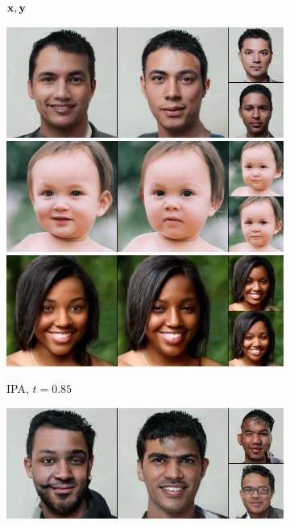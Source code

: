 \begin{figure}[t]
\begin{subfigure}[t]{0.22\textwidth}
      \caption{\scriptsize ${\mathbf{x}}, {\mathbf{y}}$}
    \end{subfigure}
    \begin{subfigure}[t]{0.25\textwidth}
      \centering
      \includegraphics[height=\ffhqimgheight]{figs/cigcvae/image-samples/ffhq256/freeform_aipo_0_t=0.85_samples.jpg}
      \includegraphics[height=\ffhqimgheight]{figs/cigcvae/image-samples/ffhq256/freeform_aipo_13_t=0.85_samples.jpg}
      \includegraphics[height=\ffhqimgheight]{figs/cigcvae/image-samples/ffhq256/freeform_aipo_32_t=0.85_samples.jpg}
      \caption{\scriptsize IPA, $t=0.85$}
    \end{subfigure}
    \begin{subfigure}[t]{0.25\textwidth}
      \centering
      \includegraphics[height=\ffhqimgheight]{figs/cigcvae/image-samples/ffhq256/freeform_aipo_0_samples.jpg}

\end{subfigure}
\end{figure}
